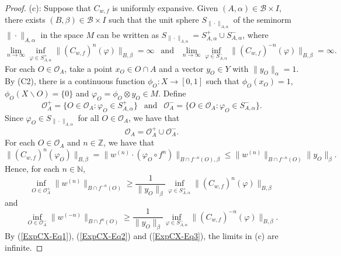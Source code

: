 \documentclass[12pt]{article}
\theoremstyle{plain}
\theoremstyle{definition}
\newcommand{\N}{\mathbb{N}} %
\newcommand{\Z}{\mathbb{Z}} %
\newcommand{\cB}{\mathcal{B}}
\newcommand{\cO}{\mathcal{O}}
\begin{document}
\begin{proof}
(c): Suppose that $C_{w,f}$ is uniformly expansive. 
Given $(A,\alpha) \in \cB \times I$, there exists $(B,\beta) \in \cB \times I$ such that the unit sphere $S_{\|\cdot\|_{A,\alpha}}$
of the seminorm $\|\cdot\|_{A,\alpha}$ in the space $M$ can be written as
$S_{\|\cdot\|_{A,\alpha}} = S^{+}_{A,\alpha} \cup S^{-}_{A,\alpha}$, where
\begin{equation}\label{ExpCX-Eq1}
\lim_{n \to \infty} \inf_{\varphi \in S^{+}_{A,\alpha}} \|(C_{w,f})^n(\varphi)\|_{B,\beta} = \infty \ \ \text{ and } \ \ 
\lim_{n \to \infty} \inf_{\varphi \in S^{-}_{A,\alpha}} \|(C_{w,f})^{-n}(\varphi)\|_{B,\beta} = \infty.
\end{equation} 
For each $O \in \cO_A$, take a point $x_O \in O \cap A$ and a vector $y_O \in Y$ with $\|y_O\|_\alpha = 1$.
By (C2), there is a continuous function $\phi_O : X \to [0,1]$ such that 
$\phi_O(x_O) = 1$, $\phi_O(X \backslash O) = \{0\}$ and $\varphi_O = \phi_O \otimes y_O \in M$.
Define
\[
\cO_A^+ = \{O \in \cO_A : \varphi_O \in S^{+}_{A,\alpha}\} \ \ \text{ and } \ \
\cO_A^- = \{O \in \cO_A : \varphi_O \in S^{-}_{A,\alpha}\}.
\]
Since $\varphi_O \in S_{\|\cdot\|_{A,\alpha}}$ for all $O \in \cO_A$, we have that
\[
\cO_A = \cO_A^+ \cup \cO_A^-.
\]
For each $O \in \cO_A$ and $n \in \Z$, we have that
\[
\|(C_{w,f})^n(\varphi_O)\|_{B,\beta} = \|w^{(n)} \cdot (\varphi_O \circ f^n)\|_{B \cap f^{-n}(O),\beta} 
  \leq \|w^{(n)}\|_{B \cap f^{-n}(O)} \|y_O\|_\beta.
\]
Hence, for each $n \in \N$,
\begin{equation}\label{ExpCX-Eq2}
\inf_{O \in \cO_A^+} \|w^{(n)}\|_{B\cap f^{-n}(O)} 
  \geq \frac{1}{\|y_O\|_\beta} \inf_{\varphi \in S^{+}_{A,\alpha}} \|(C_{w,f})^n(\varphi)\|_{B,\beta}
\end{equation}
and
\begin{equation}\label{ExpCX-Eq3}
\inf_{O \in \cO_A^-} \|w^{(-n)}\|_{B\cap f^{n}(O)} 
  \geq \frac{1}{\|y_O\|_\beta} \inf_{\varphi \in S^{-}_{A,\alpha}} \|(C_{w,f})^{-n}(\varphi)\|_{B,\beta}.
\end{equation}
By (\ref{ExpCX-Eq1}), (\ref{ExpCX-Eq2}) and (\ref{ExpCX-Eq3}), the limits in (c) are infinite.


\end{proof}
\end{document}
